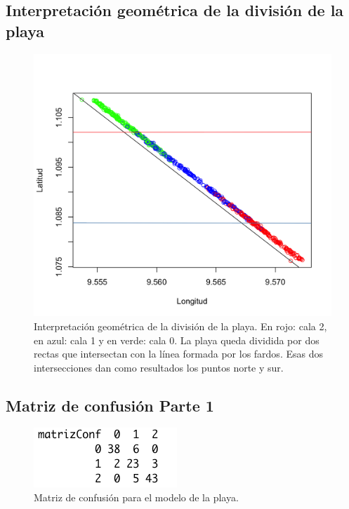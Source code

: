 \documentclass{article}
\begin{document}
\newpage
\subsection{Interpretación geométrica de la división de la playa}
\begin{figure}[htbp]
    \centering
    \includegraphics[scale=0.25]{images/interpretacionModelosBuenos.png}
    \caption{Interpretación geométrica de la división de la playa. En rojo: cala 2, en azul: cala 1 y en verde: cala 0. La playa queda dividida por dos rectas que intersectan con la línea formada por los fardos. Esas dos intersecciones dan como resultados los puntos norte y sur.}
    \label{fig:divisionPlayaRectas}
\end{figure}


\subsection{Matriz de confusión Parte 1}
\begin{figure}[htbp]
    \centering
    \includegraphics[scale=0.6]{images/matrizConfusion.png}
    \caption{Matriz de confusión para el modelo de la playa.}
    \label{fig:matrizConfusion}
\end{figure}
\end{document}
